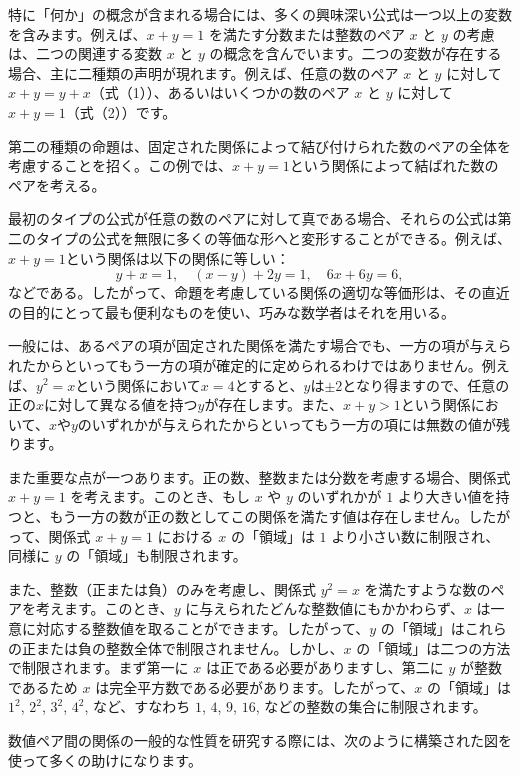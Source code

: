 \documentclass[a4paper,11pt,openany]{ltjsbook}
\begin{document}
特に「何か」の概念が含まれる場合には、多くの興味深い公式は一つ以上の変数を含みます。例えば、$x + y = 1$ を満たす分数または整数のペア $x$ と $y$ の考慮は、二つの関連する変数 $x$ と $y$ の概念を含んでいます。二つの変数が存在する場合、主に二種類の声明が現れます。例えば、任意の数のペア $x$ と $y$ に対して $x + y = y + x$（式（1））、あるいはいくつかの数のペア $x$ と $y$ に対して $x + y = 1$（式（2））です。

第二の種類の命題は、固定された関係によって結び付けられた数のペアの全体を考慮することを招く。この例では、$x + y = 1$という関係によって結ばれた数のペアを考える。

最初のタイプの公式が任意の数のペアに対して真である場合、それらの公式は第二のタイプの公式を無限に多くの等価な形へと変形することができる。例えば、$x + y = 1$という関係は以下の関係に等しい：
\[
y + x = 1,\quad
(x - y) + 2y = 1,\quad
6x + 6y = 6,
\]
などである。したがって、命題を考慮している関係の適切な等価形は、その直近の目的にとって最も便利なものを使い、巧みな数学者はそれを用いる。

一般には、あるペアの項が固定された関係を満たす場合でも、一方の項が与えられたからといってもう一方の項が確定的に定められるわけではありません。例えば、$y^2 = x$という関係において$x = 4$とすると、$y$は$\pm 2$となり得ますので、任意の正の$x$に対して異なる値を持つ$y$が存在します。また、$x + y > 1$という関係において、$x$や$y$のいずれかが与えられたからといってもう一方の項には無数の値が残ります。

また重要な点が一つあります。正の数、整数または分数を考慮する場合、関係式 $x + y = 1$ を考えます。このとき、もし $x$ や $y$ のいずれかが $1$ より大きい値を持つと、もう一方の数が正の数としてこの関係を満たす値は存在しません。したがって、関係式 $x + y = 1$ における $x$ の「領域」は $1$ より小さい数に制限され、同様に $y$ の「領域」も制限されます。

また、整数（正または負）のみを考慮し、関係式 $y^{2} = x$ を満たすような数のペアを考えます。このとき、$y$ に与えられたどんな整数値にもかかわらず、$x$ は一意に対応する整数値を取ることができます。したがって、$y$ の「領域」はこれらの正または負の整数全体で制限されません。しかし、$x$ の「領域」は二つの方法で制限されます。まず第一に $x$ は正である必要がありますし、第二に $y$ が整数であるため $x$ は完全平方数である必要があります。したがって、$x$ の「領域」は $1^{2}$, $2^{2}$, $3^{2}$, $4^{2}$, など、すなわち $1$, $4$, $9$, $16$, などの整数の集合に制限されます。

数値ペア間の関係の一般的な性質を研究する際には、次のように構築された図を使って多くの助けになります。
\end{document}
